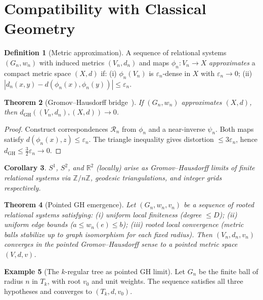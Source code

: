 \documentclass{article}
\newtheorem{theorem}{Theorem}[section]
\newtheorem{corollary}[theorem]{Corollary}
\theoremstyle{definition}
\newtheorem{definition}[theorem]{Definition}
\newtheorem{example}[theorem]{Example}
\theoremstyle{remark}
\begin{document}
\section{Compatibility with Classical Geometry}
\label{sec:classical}

\begin{definition}[Metric approximation]
A sequence of relational systems $(G_n, w_n)$ with induced metrics
$(V_n, d_n)$ and maps $\phi_n : V_n \to X$ \emph{approximates}
a compact metric space $(X,d)$ if: (i) $\phi_n(V_n)$ is
$\varepsilon_n$-dense in $X$ with $\varepsilon_n \to 0$; (ii)
$|d_n(x,y) - d(\phi_n(x),\phi_n(y))| \leq \varepsilon_n$.
\end{definition}

\begin{theorem}[Gromov--Hausdorff bridge~\cite{buragoetal}]
\label{thm:ghbridge}
If $(G_n, w_n)$ approximates $(X,d)$, then
$d_{\mathrm{GH}}((V_n, d_n), (X,d)) \to 0$.
\end{theorem}

\begin{proof}
Construct correspondences $\mathcal{R}_n$ from $\phi_n$ and a
near-inverse $\psi_n$. Both maps satisfy
$d(\phi_n(x), z) \leq \varepsilon_n$. The triangle inequality gives
distortion $\leq 3\varepsilon_n$, hence
$d_{\mathrm{GH}} \leq \frac{3}{2}\varepsilon_n \to 0$.
\end{proof}

\begin{corollary}
$S^1$, $S^2$, and $\mathbb{R}^2$ (locally) arise as
Gromov--Hausdorff limits of finite relational systems via
$\mathbb{Z}/n\mathbb{Z}$, geodesic triangulations, and integer
grids respectively.
\end{corollary}

\begin{theorem}[Pointed GH emergence]
\label{thm:pointed_gh}
Let $(G_n, w_n, v_n)$ be a sequence of rooted relational systems
satisfying: (i) uniform local finiteness (degree $\leq D$);
(ii) uniform edge bounds ($a \leq w_n(e) \leq b$);
(iii) rooted local convergence (metric balls stabilize up to
graph isomorphism for each fixed radius). Then $(V_n, d_n, v_n)$
converges in the pointed Gromov--Hausdorff sense to a pointed
metric space $(V, d, v)$.
\end{theorem}

\begin{example}[The $k$-regular tree as pointed GH limit]
\label{ex:tree_pointed_gh}
Let $G_n$ be the finite ball of radius $n$ in $T_k$, with root
$v_0$ and unit weights. The sequence satisfies all three
hypotheses and converges to $(T_k, d, v_0)$.
\end{example}
\end{document}
